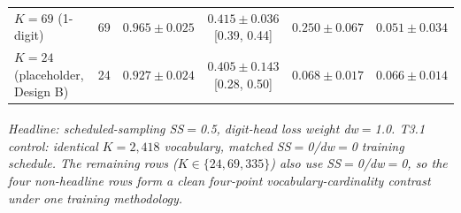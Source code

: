 \begin{table}[!htbp]
{\begin{tabular}{l c c c c c}
$K\!=\!69$ (1-digit)               &    69 & $0.965 \pm 0.025$ & $0.415 \pm 0.036$ \tiny{[0.39, 0.44]} & $0.250 \pm 0.067$ & $0.051 \pm 0.034$ \\
$K\!=\!24$ (placeholder, Design B) &    24 & $0.927 \pm 0.024$ & $0.405 \pm 0.143$ \tiny{[0.28, 0.50]} & $0.068 \pm 0.017$ & $0.066 \pm 0.014$ \\
\bottomrule
\end{tabular}}
\par\smallskip
\footnotesize\textit{\textsuperscript{\dag}Headline: scheduled-sampling
SS$=$0.5, digit-head loss weight dw$=$1.0.
\textsuperscript{\ddag}T3.1 control: identical $K\!=\!2{,}418$ vocabulary,
matched SS$=$0/dw$=$0 training schedule. The remaining rows
($K\!\in\!\{24, 69, 335\}$) also use SS$=$0/dw$=$0, so the four
non-headline rows form a clean four-point vocabulary-cardinality
contrast under one training methodology.}
\end{table}
